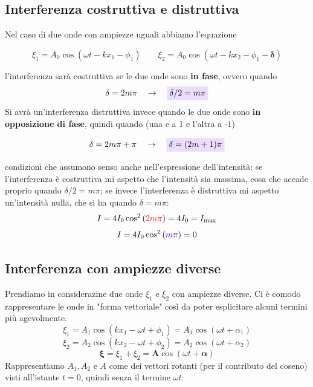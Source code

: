 \documentclass[x11names]{report}
\newcommand{\viola}[1]{\colorbox{yred}{$\displaystyle #1$}}
\begin{document}
	\begin{es}{}
		\subsection{Interferenza costruttiva e distruttiva}
		Nel caso di due onde con ampiezze uguali abbiamo l'equazione 
		
		\[ 
		\xi_1 = A_0\cos\left(\omega t - kx_1 - \phi_1\right)
		\qquad
		\xi_2 = A_0\cos\left(\omega t - kx_2 - \phi_1 - \boldsymbol{\delta}\right)
		\] 
		
		l'interferenza sarà costruttiva se le due onde sono \textbf{in fase}, ovvero quando 
		\[ 
		\delta = 2m\pi \quad \to \quad \viola{\delta/2 = m\pi }
		\]
		Si avrà un'interferenza distruttiva invece quando le due onde sono \textbf{in opposizione di fase}, quindi quando (una e a 1 e l'altra a -1)
		
		\[ 
		\delta = 2m\pi + \pi \quad \to \quad \viola{\delta = (2m+1)\pi }
		\]
		
		condizioni che assumono senso anche nell'espressione dell'intensità: se l'interferenza è costruttiva mi aspetto che l'intensità sia massima, cosa che accade proprio quando  \(\delta/2 = m\pi \); se invece l'interferenza è distruttiva mi aspetto un'intensità nulla, che si ha quando \(\delta = m\pi \):
		\[ 
		I = 4I_0 \cos^2\left(\textcolor{red}{2m\pi }\right) = 4I_0 = I_\text{max}
		\]
		\[ 
		I = 4I_0 \cos^2\left(\textcolor{blue}{m\pi }\right) = 0 
		\]
	\end{es}
	
	\subsection{Interferenza con ampiezze diverse}
	Prendiamo in considerazine due onde \(\xi_1\) e \(\xi_2\) con ampiezze diverse. Ci è comodo rappresentare le onde in "forma vettoriale" così da poter esplicitare alcuni termini più agevolmente.
	\[ 
	\xi_1 = A_1 \cos\left(kx_1 - \omega t + \phi_1\right) = A_1 \cos\left(\omega t + \alpha_1\right)
	\]
	\[ 
	\xi_2 = A_2 \cos\left(kx_2 - \omega t + \phi_2\right) = A_2 \cos\left(\omega t + \alpha_2\right)
	\]
	\[ 
	\boldsymbol{\xi} = \xi _1 + \xi _2 = \boldsymbol{A}\cos\left(\omega t + \boldsymbol{\alpha}\right)
	\]
	Rappresentiamo \(A_1,A_2\) e \(A\) come dei vettori rotanti (per il contributo del coseno) visti all'istante \(t=0\), quindi senza il termine \(\omega t\):
	
\end{document}
